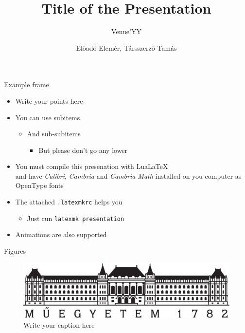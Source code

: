 \documentclass[t,aspectratio=169]{beamer}
\title{Title of the Presentation}
\subtitle{Venue'YY}
\author{Előadó Elemér, Társszerző Tamás}
\begin{document}
	{
		\begin{frame}
			\titlepage
		\end{frame}
	}
	\addtocounter{framenumber}{-1}
  
\begin{frame}{Example frame}
  \begin{itemize}
  \item Write your points here
  \item You can use subitems
    \begin{itemize}
    \item And sub-subitems
      \begin{itemize}
      \item But please don't go any lower
      \end{itemize}
    \end{itemize}
  \item You must compile this presenation with Lua\LaTeX\\
    and have \emph{Calibri}, \emph{Cambria} and \emph{Cambria Math}
    installed on you computer as OpenType fonts
  \item The attached \texttt{.latexmkrc} helps you
    \begin{itemize}
    \item Just run \texttt{latexmk presentation}
    \end{itemize}
  \item<2-> Animations are also supported
  \end{itemize}
\end{frame}

\begin{frame}[c]{Figures}
  \begin{figure}
    \centering
    \includegraphics[width=\textwidth]{figures/BME.pdf}
    \caption{Write your caption here}
  \end{figure}
\end{frame}
\end{document}
